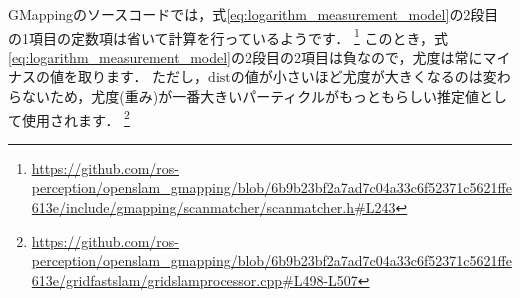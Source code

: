 \documentclass[{../../master}]{subfiles}
\begin{document}
GMappingのソースコードでは，式\ref{eq:logarithm_measurement_model}の2段目の1項目の定数項は省いて計算を行っているようです．
\footnote{\url{https://github.com/ros-perception/openslam_gmapping/blob/6b9b23bf2a7ad7c04a33c6f52371c5621ffe613e/include/gmapping/scanmatcher/scanmatcher.h\#L243}}
このとき，式\ref{eq:logarithm_measurement_model}の2段目の2項目は負なので，尤度は常にマイナスの値を取ります．
ただし，$\text{dist}$の値が小さいほど尤度が大きくなるのは変わらないため，尤度(重み)が一番大きいパーティクルがもっともらしい推定値として使用されます．
\footnote{\url{https://github.com/ros-perception/openslam_gmapping/blob/6b9b23bf2a7ad7c04a33c6f52371c5621ffe613e/gridfastslam/gridslamprocessor.cpp\#L498-L507}}
\end{document}
